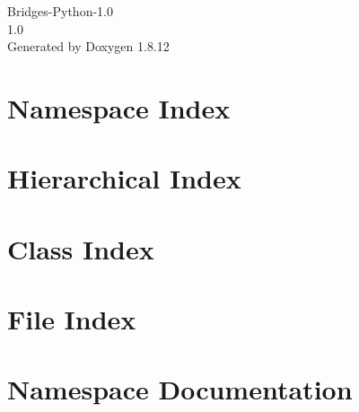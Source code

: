 \documentclass[twoside]{book}
\newcommand{\+}{\discretionary{\mbox{\scriptsize$\hookleftarrow$}}{}{}}
\newcommand{\clearemptydoublepage}{%
  \newpage{\pagestyle{empty}\cleardoublepage}%
}
\begin{document}
\hypersetup{pageanchor=false,
             bookmarksnumbered=true,
             pdfencoding=unicode
            }
\begin{titlepage}
\vspace*{7cm}
\begin{center}%
{\Large Bridges-\/\+Python-\/1.0 \\[1ex]\large 1.\+0 }\\
\vspace*{1cm}
{\large Generated by Doxygen 1.8.12}\\
\end{center}
\end{titlepage}
\clearemptydoublepage
{}
\tableofcontents
\clearemptydoublepage
{}
\hypersetup{pageanchor=true}

\chapter{Namespace Index}

\chapter{Hierarchical Index}

\chapter{Class Index}

\chapter{File Index}

\chapter{Namespace Documentation}


















\end{document}
